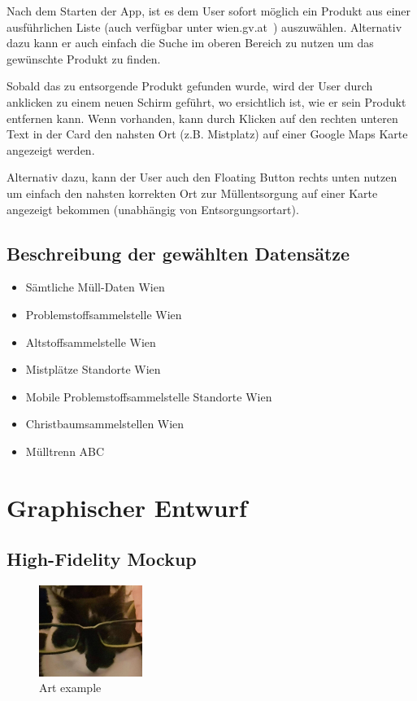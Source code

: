 \documentclass[a4paper]{scrreprt}
\begin{document}
Nach dem Starten der App, ist es dem User sofort möglich ein Produkt aus einer ausführlichen Liste (auch verfügbar unter wien.gv.at~\cite{muelltrennabc}) auszuwählen. Alternativ dazu kann er auch einfach die Suche im oberen Bereich zu nutzen um das gewünschte Produkt zu finden.

Sobald das zu entsorgende Produkt gefunden wurde, wird der User durch anklicken zu einem neuen Schirm geführt, wo ersichtlich ist, wie er sein Produkt entfernen kann. Wenn vorhanden, kann durch Klicken auf den rechten unteren Text in der Card den nahsten Ort (z.B. Mistplatz) auf einer Google Maps Karte angezeigt werden.

Alternativ dazu, kann der User auch den Floating Button rechts unten nutzen um einfach den nahsten korrekten Ort zur Müllentsorgung auf einer Karte angezeigt bekommen (unabhängig von Entsorgungsortart).

\section{Beschreibung der gewählten Datensätze}
\begin{itemize}
	\item Sämtliche Müll-Daten Wien \cite{alleMuell}
	\item Problemstoffsammelstelle Wien \cite{problemstoffsammelstellen}
	\item Altstoffsammelstelle Wien \cite{alstoffsammelstellen}
	\item Mistplätze Standorte Wien \cite{mistplaetze}
	\item Mobile Problemstoffsammelstelle Standorte Wien \cite{mobileProblemstoffsmst}
	\item Christbaumsammelstellen Wien \cite{christbaumsammelstellen}
	\item Mülltrenn ABC \cite{muelltrennabc}
\end{itemize}


\chapter{Graphischer Entwurf} 

\section{High-Fidelity Mockup}
\begin{figure}[h]
\centering
\includegraphics[width=0.3\textwidth]{../graphical/test.jpg}
\caption{\label{fig:art1} Art example}
\end{figure}
\end{document}
